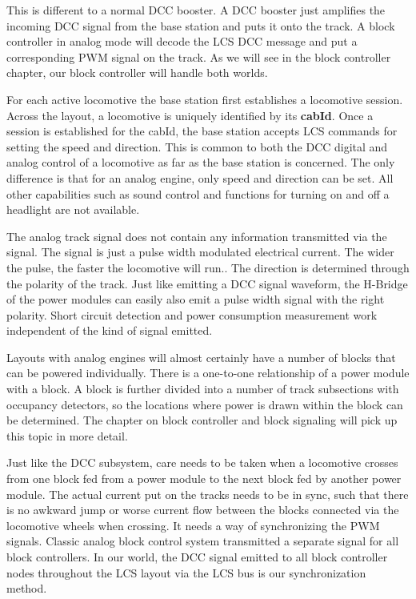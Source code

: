 This is different to a normal DCC booster. A DCC booster just amplifies the incoming DCC signal from the base station and puts it onto the track. A block controller in analog mode will decode the LCS DCC message and put a corresponding PWM signal on the track. As we will see in the block controller chapter, our block controller will handle both worlds.


For each active locomotive the base station first establishes a locomotive session. Across the layout, a locomotive is uniquely identified by its \textbf{cabId}. Once a session is established for the cabId, the base station accepts LCS commands for setting the speed and direction. This is common to both the DCC digital and analog control of a locomotive as far as the base station is concerned. The only difference is that for an analog engine, only speed and direction can be set. All other capabilities such as sound control and functions for turning on and off a headlight are not available.


The analog track signal does not contain any information transmitted via the signal. The signal is just a pulse width modulated electrical current. The wider the pulse, the faster the locomotive will run.. The direction is determined through the polarity of the track. Just like emitting a DCC signal waveform, the H-Bridge of the power modules can easily also emit a pulse width signal with the right polarity. Short circuit detection and power consumption measurement work independent of the kind of signal emitted.


Layouts with analog engines will almost certainly have a number of blocks that can be powered individually. There is a one-to-one relationship of a power module with a block. A block is further divided into a number of track subsections with occupancy detectors, so the locations where power is drawn within the block can be determined. The chapter on block controller and block signaling will pick up this topic in more detail.

Just like the DCC subsystem, care needs to be taken when a locomotive crosses from one block fed from a power module to the next block fed by another power module. The actual current put on the tracks needs to be in sync, such that there is no awkward jump or worse current flow between the blocks connected via the locomotive wheels when crossing. It needs a way of synchronizing the PWM signals. Classic analog block control system transmitted a separate signal for all block controllers. In our world, the DCC signal emitted to all block controller nodes throughout the LCS layout via the LCS bus is our synchronization method.

